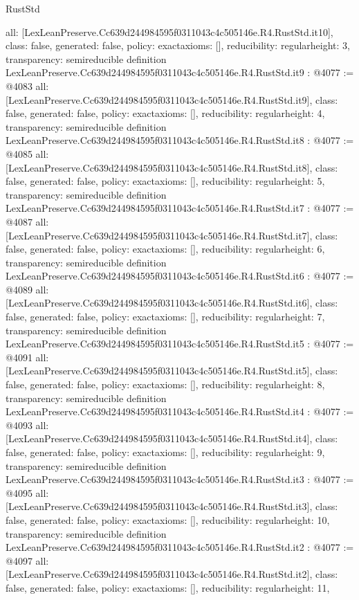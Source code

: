 \begin{lexlean}{RustStd}
\begin{coremodule}
{  all: [LexLeanPreserve.Cc639d244984595f0311043c4c505146e.R4.RustStd.it10],
  class: false,
  generated: false,
  policy: exact{axioms: []},
  reducibility: regular{height: 3},
  transparency: semireducible
}
definition LexLeanPreserve.Cc639d244984595f0311043c4c505146e.R4.RustStd.it9 : @4077 := @4083 {
  all: [LexLeanPreserve.Cc639d244984595f0311043c4c505146e.R4.RustStd.it9],
  class: false,
  generated: false,
  policy: exact{axioms: []},
  reducibility: regular{height: 4},
  transparency: semireducible
}
definition LexLeanPreserve.Cc639d244984595f0311043c4c505146e.R4.RustStd.it8 : @4077 := @4085 {
  all: [LexLeanPreserve.Cc639d244984595f0311043c4c505146e.R4.RustStd.it8],
  class: false,
  generated: false,
  policy: exact{axioms: []},
  reducibility: regular{height: 5},
  transparency: semireducible
}
definition LexLeanPreserve.Cc639d244984595f0311043c4c505146e.R4.RustStd.it7 : @4077 := @4087 {
  all: [LexLeanPreserve.Cc639d244984595f0311043c4c505146e.R4.RustStd.it7],
  class: false,
  generated: false,
  policy: exact{axioms: []},
  reducibility: regular{height: 6},
  transparency: semireducible
}
definition LexLeanPreserve.Cc639d244984595f0311043c4c505146e.R4.RustStd.it6 : @4077 := @4089 {
  all: [LexLeanPreserve.Cc639d244984595f0311043c4c505146e.R4.RustStd.it6],
  class: false,
  generated: false,
  policy: exact{axioms: []},
  reducibility: regular{height: 7},
  transparency: semireducible
}
definition LexLeanPreserve.Cc639d244984595f0311043c4c505146e.R4.RustStd.it5 : @4077 := @4091 {
  all: [LexLeanPreserve.Cc639d244984595f0311043c4c505146e.R4.RustStd.it5],
  class: false,
  generated: false,
  policy: exact{axioms: []},
  reducibility: regular{height: 8},
  transparency: semireducible
}
definition LexLeanPreserve.Cc639d244984595f0311043c4c505146e.R4.RustStd.it4 : @4077 := @4093 {
  all: [LexLeanPreserve.Cc639d244984595f0311043c4c505146e.R4.RustStd.it4],
  class: false,
  generated: false,
  policy: exact{axioms: []},
  reducibility: regular{height: 9},
  transparency: semireducible
}
definition LexLeanPreserve.Cc639d244984595f0311043c4c505146e.R4.RustStd.it3 : @4077 := @4095 {
  all: [LexLeanPreserve.Cc639d244984595f0311043c4c505146e.R4.RustStd.it3],
  class: false,
  generated: false,
  policy: exact{axioms: []},
  reducibility: regular{height: 10},
  transparency: semireducible
}
definition LexLeanPreserve.Cc639d244984595f0311043c4c505146e.R4.RustStd.it2 : @4077 := @4097 {
  all: [LexLeanPreserve.Cc639d244984595f0311043c4c505146e.R4.RustStd.it2],
  class: false,
  generated: false,
  policy: exact{axioms: []},
  reducibility: regular{height: 11},
}
\end{coremodule}
\end{lexlean}
